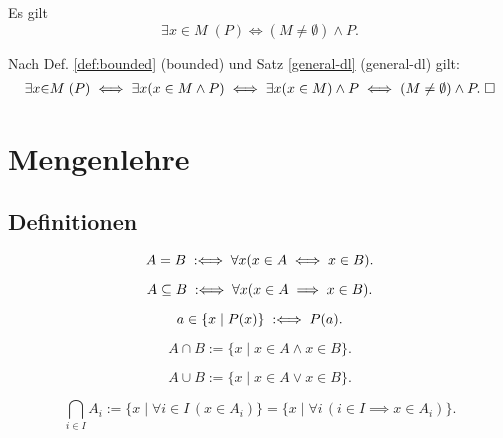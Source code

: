 \begin{Satz}
Es gilt
\[\exists x{\in}M\;(P) \iff (M\ne\emptyset)\land P.\]
\end{Satz}

\begin{Beweis}
Nach Def. \ref{def:bounded} (bounded) und Satz
\ref{general-dl} (general-dl) gilt:
\begin{gather*}
\exists x{\in}M\;(P) \iff \exists x(x\in M\land P)
\iff \exists x(x\in M)\land P\iff (M\ne\emptyset)\land P.\;\square
\end{gather*}
\end{Beweis}

\newpage
\section{Mengenlehre}
\subsection{Definitionen}

\begin{Definition}
\label{def:seteq}
\[A=B \;:\Longleftrightarrow\; \forall x(x\in A\iff x\in B).\]
\end{Definition}

\begin{Definition}%
\label{def:subseteq}
\[A\subseteq B \;:\Longleftrightarrow\; \forall x(x\in A\implies x\in B).\]
\end{Definition}

\begin{Definition}\label{def:filter}
\[a\in\{x\mid P(x)\} \;:\Longleftrightarrow\; P(a).\]
\end{Definition}

\begin{Definition}%
\label{def:cap}
\[A\cap B := \{x\mid x\in A\land x\in B\}.\]
\end{Definition}

\begin{Definition}%
\label{def:cup}
\[A\cup B := \{x\mid x\in A\lor x\in B\}.\]
\end{Definition}

\begin{Definition}\label{def:intersection}
\[\bigcap_{i\in I} A_i := \{x\mid \forall i{\in}I\,(x\in A_i)\}
= \{x\mid \forall i\,(i\in I\implies x\in A_i)\}.\]
\end{Definition}

